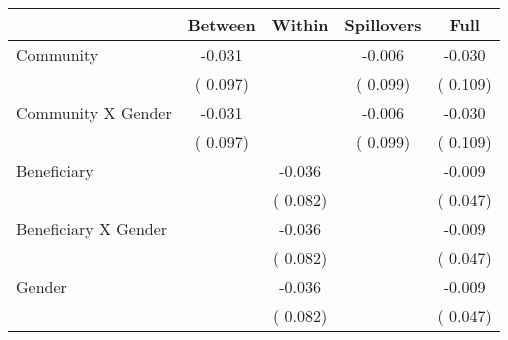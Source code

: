 
\begin{tabular}{l*{4}{c}}\hline&\multicolumn{1}{c}{Between}&\multicolumn{1}{c}{Within}&\multicolumn{1}{c}{Spillovers}&\multicolumn{1}{c}{Full}\\ \hline
 Community                                     &             -0.031      &                                               &       -0.006 &        -0.030                            \\ 
                                                       &        (       0.097)           &                                       &       (       0.099)     &      (       0.109)                                           \\ 
 Community X Gender            &             -0.031      &                                               &       -0.006 &        -0.030                            \\ 
                                                       &        (       0.097)           &                                       &       (       0.099)     &      (       0.109)                                           \\ 
 Beneficiary                           &                                               &       -0.036    &                                &            -0.009                            \\ 
                                                       &                                               & (       0.082)                  &                                        &      (       0.047)                                           \\ 
 Beneficiary X Gender          &                                               &       -0.036    &                                &            -0.009                            \\ 
                                                       &                                               & (       0.082)                  &                                        &      (       0.047)                                           \\ 
 Gender                                        &                              &       -0.036    &                                &            -0.009                            \\ 
                                                       &                                               & (       0.082)                  &                                        &      (       0.047)                                           \\ 

\end{tabular}
